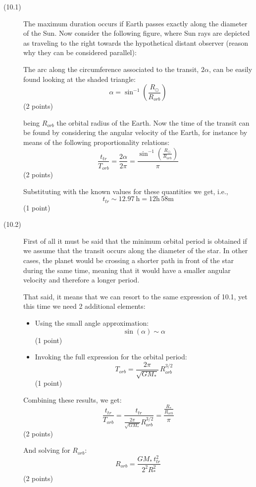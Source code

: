 \begin{description}
\item[(10.1)] The maximum duration occurs if Earth passes exactly along the
diameter of the Sun. Now consider the following figure, where Sun rays are
depicted as traveling to the right towards the hypothetical distant observer
(reason why they can be considered parallel):

The arc along the circumference associated to the transit, $2\alpha$, can be
easily found looking at the shaded triangle:
\[ \alpha = \sin^{-1}\!\left(\frac{R_\odot}{R_{orb}}\right) \]
\hfill(2 points)

being $R_{orb}$ the orbital radius of the Earth. Now the time of the transit
can be found by considering the angular velocity of the Earth, for instance by
means of the following proportionality relations:
\[ \frac{t_{tr}}{T_{orb}} = \frac{2\alpha}{2\pi}
   = \frac{\sin^{-1}\!\left(\frac{R_\odot}{R_{orb}}\right)}{\pi} \]
\hfill(2 points)

Substituting with the known values for these quantities we get, i.e.,
\[ t_{tr} \sim 12.97\ \mathrm{h} = 12\mathrm{h}\,58\mathrm{m} \]
\hfill(1 point)

\item[(10.2)] First of all it must be said that the minimum orbital period is
obtained if we assume that the transit occurs along the diameter of the star.
In other cases, the planet would be crossing a shorter path in front of the
star during the same time, meaning that it would have a smaller angular
velocity and therefore a longer period.

That said, it means that we can resort to the same expression of 10.1, yet
this time we need 2 additional elements:
\begin{itemize}
\item Using the small angle approximation:
\[ \sin(\alpha) \sim \alpha \]
\hfill(1 point)
\item Invoking the full expression for the orbital period:
\[ T_{orb} = \frac{2\pi}{\sqrt{GM_*}}\,R_{orb}^{3/2} \]
\hfill(1 point)
\end{itemize}

Combining these results, we get:
\[ \frac{t_{tr}}{T_{orb}}
   = \frac{t_{tr}}{\frac{2\pi}{\sqrt{GM_*}}R_{orb}^{3/2}}
   = \frac{\frac{R_*}{R_{orb}}}{\pi} \]
\hfill(2 points)

And solving for $R_{orb}$:
\[ R_{orb} = \frac{GM_*\,t_{tr}^2}{2^2 R_*^2} \]
\hfill(2 points)


\end{description}
